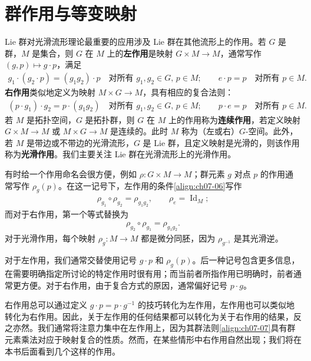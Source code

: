 \documentclass[../../main.tex]{subfiles}
\begin{document}
\section{群作用与等变映射}\label{section:ch07-群作用与等变映射}

Lie 群对光滑流形理论最重要的应用涉及 Lie 群在其他流形上的作用。若 $G$ 是群，$M$ 是集合，则 $G$ 在 $M$ 上的\textbf{左作用}是映射 $G\times M\to M$，通常写作 $(g,p)\mapsto g\cdot p$，满足
\begin{align}
g_1\cdot(g_2\cdot p)=(g_1g_2)\cdot p\quad\text{对所有 }g_1,g_2\in G,\,p\in M;\qquad e\cdot p=p\quad\text{对所有 }p\in M.\label{align:ch07-06}
\end{align}
\textbf{右作用}类似地定义为映射 $M\times G\to M$，具有相应的复合法则：
\begin{align*}
(p\cdot g_1)\cdot g_2=p\cdot(g_1g_2)\quad\text{对所有 }g_1,g_2\in G,\,p\in M;\qquad p\cdot e=p\quad\text{对所有 }p\in M.
\end{align*}
若 $M$ 是拓扑空间，$G$ 是拓扑群，则 $G$ 在 $M$ 上的作用称为\textbf{连续作用}，若定义映射 $G\times M\to M$ 或 $M\times G\to M$ 是连续的。此时 $M$ 称为（左或右）$G$-空间。此外，若 $M$ 是带边或不带边的光滑流形，$G$ 是 Lie 群，且定义映射是光滑的，则该作用称为\textbf{光滑作用}。我们主要关注 Lie 群在光滑流形上的光滑作用。

有时给一个作用命名会很方便，例如 $\rho\colon G\times M\to M$；群元素 $g$ 对点 $p$ 的作用通常写作 $\rho_g(p)$。在这一记号下，左作用的条件\eqref{align:ch07-06}写作
\begin{align}
\rho_{g_1}\circ\rho_{g_2}=\rho_{g_1g_2},\qquad \rho_e=\operatorname{Id}_M;\label{align:ch07-07}
\end{align}
而对于右作用，第一个等式替换为
\begin{align*}
\rho_{g_2}\circ\rho_{g_1}=\rho_{g_1g_2}.
\end{align*}
对于光滑作用，每个映射 $\rho_g\colon M\to M$ 都是微分同胚，因为 $\rho_{g^{-1}}$ 是其光滑逆。

对于左作用，我们通常交替使用记号 $g\cdot p$ 和 $\rho_g(p)$。后一种记号包含更多信息，在需要明确指定所讨论的特定作用时很有用；而当前者所指作用已明确时，前者通常更方便。对于右作用，由于复合方式的原因，通常偏好记号 $p\cdot g$。

右作用总可以通过定义 $g\cdot p=p\cdot g^{-1}$ 的技巧转化为左作用，左作用也可以类似地转化为右作用。因此，关于左作用的任何结果都可以转化为关于右作用的结果，反之亦然。我们通常将注意力集中在左作用上，因为其群法则\eqref{align:ch07-07}具有群元素乘法对应于映射复合的性质。然而，在某些情形中右作用自然出现；我们将在本书后面看到几个这样的作用。
\end{document}
